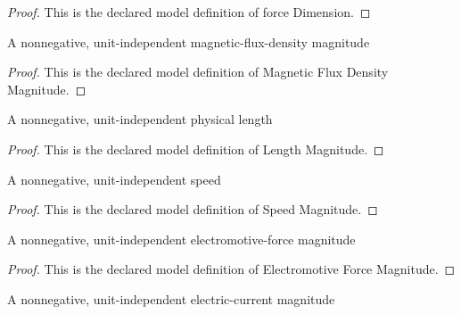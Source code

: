 \begin{proof}
  This is the declared model definition of force Dimension.
\end{proof}
\begin{definition}
  \label{def:physics:phyx-mini-0937:phyxminiproblems-problemphyxmini0937-magneticfluxdensitymagnitude}
  A nonnegative, unit-independent magnetic-flux-density magnitude
\end{definition}
\begin{proof}
  This is the declared model definition of Magnetic Flux Density Magnitude.
\end{proof}
\begin{definition}
  \label{def:physics:phyx-mini-0937:phyxminiproblems-problemphyxmini0937-lengthmagnitude}
  A nonnegative, unit-independent physical length
\end{definition}
\begin{proof}
  This is the declared model definition of Length Magnitude.
\end{proof}
\begin{definition}
  \label{def:physics:phyx-mini-0937:phyxminiproblems-problemphyxmini0937-speedmagnitude}
  A nonnegative, unit-independent speed
\end{definition}
\begin{proof}
  This is the declared model definition of Speed Magnitude.
\end{proof}
\begin{definition}
  \label{def:physics:phyx-mini-0937:phyxminiproblems-problemphyxmini0937-electromotiveforcemagnitude}
  A nonnegative, unit-independent electromotive-force magnitude
\end{definition}
\begin{proof}
  This is the declared model definition of Electromotive Force Magnitude.
\end{proof}
\begin{definition}
  \label{def:physics:phyx-mini-0937:phyxminiproblems-problemphyxmini0937-electriccurrentmagnitude}
  A nonnegative, unit-independent electric-current magnitude
\end{definition}
